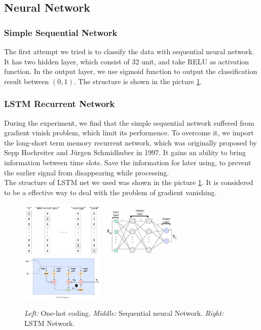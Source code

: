 \documentclass{article}
\begin{document}
\subsection{Neural Network}
\subsubsection{Simple Sequential Network}
The first attempt we tried is to classify the data with sequential neural network. It has two hidden layer, which consist of 32 unit, and take RELU as activation function. In the output layer, we use sigmoid function to output the classification result between $(0,1)$. The structure is shown in the picture \ref{fig:result1}.
\subsubsection{LSTM Recurrent Network}
During the experiment, we find that the simple sequential network suffered from gradient vinish problem, which limit its performence. To overcome it, we import the long-short term memory recurrent network, which was originally proposed by Sepp Hochreiter and Jürgen Schmidhuber in 1997. It gains an ability to bring information between time slots. Save the information for later using, to prevent the earlier signal from disappearing while processing.\\
The structure of LSTM net we used was shown in the picture \ref{fig:result1}. It is considered to be a effective way to deal with the problem of gradient vanishing.

\begin{figure}[h]
	\centering
	\includegraphics[width=4cm]{fig/oneHot.jpg}
	\includegraphics[width=4cm]{fig/snn.jpg}
	\includegraphics[width=4cm]{fig/lstm.jpg}
	\caption{\emph{Left:} One-hot coding. \emph{Middle:} Sequential neural Network. \emph{Right:} LSTM Network.}
	\label{fig:result1}
\end{figure}
\end{document}
